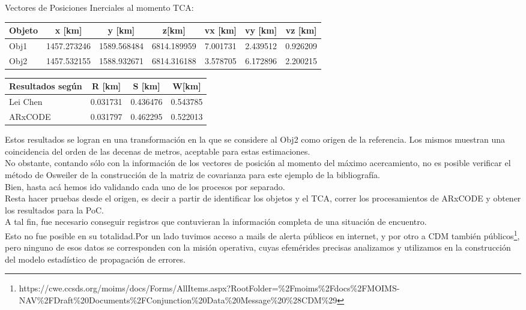 Vectores de Posiciones Inerciales al momento TCA:\\

\begin{table}[!h]
\centering
\begin{tabular}{l|c|c|c|c|c|c}
\hline
Objeto & x [km] & y [km] &z[km] &vx [km] &vy [km] &vz [km]\\
\hline
Obj1 & 1457.273246 &1589.568484&6814.189959&7.001731&2.439512&0.926209\\
\hline
Obj2 & 1457.532155&1588.932671&6814.316188&3.578705&6.172896&2.200215\\
\hline
\end{tabular}
\end{table}

\begin{table}[!h]
\large
 \centering
\begin{tabular}{|l|c|c|c|}
\hline
Resultados seg\'un & R [km] & S [km] & W[km] \\
\hline
Lei Chen & 0.031731& 0.436476&0.543785\\
\hline
ARxCODE & 0.031797& 0.462295 &0.522013
\\
\hline
\end{tabular}
\end{table}

Estos resultados se logran en una transformaci\'on en la que se considere al Obj2 como origen de la referencia. Los mismos muestran una coincidencia del orden de las decenas de metros, aceptable para estas estimaciones.\\
No obstante, contando s\'olo con la informaci\'on de los vectores de posici\'on al momento del m\'aximo acercamiento, no es posible verificar el m\'etodo de Osweiler de la construcci\'on de la matriz de covarianza para este ejemplo de la bibliograf\'ia.\\

Bien, hasta ac\'a hemos ido validando cada uno de los procesos por separado.\\
Resta hacer pruebas desde el origen, es decir a partir de identificar los objetos y el TCA, correr los procesamientos de ARxCODE y obtener los resultados para la PoC.\\
A tal fin, fue necesario conseguir registros que contuvieran la informaci\'on completa de una situaci\'on de encuentro.\\
Esto no fue posible en su totalidad.Por un lado tuvimos acceso a mails de alerta p\'ublicos en internet, y por otro a CDM tambi\'en p\'ublicos\footnote{https://cwe.ccsds.org/moims/docs/Forms/AllItems.aspx?RootFolder=\%2Fmoims\%2Fdocs\%2FMOIMS-NAV\%2FDraft\%20Documents\%2FConjunction\%20Data\%20Message\%20\%28CDM\%29}, pero ninguno de esos datos se corresponden con la misi\'on operativa, cuyas efem\'erides precisas analizamos y utilizamos en la construcci\'on del modelo estad\'istico de propagaci\'on de errores.\\


